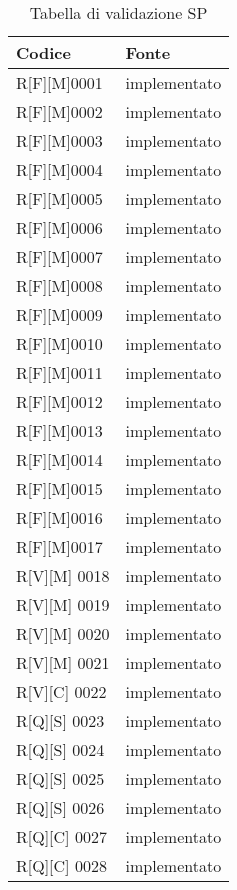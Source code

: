 \begin{center}
    \begin{longtable}{|p{3cm}|p{3cm}|}%
    \caption{Tabella di validazione SP}
    \label{tab:validazione-sp}
    \endfirsthead
    \endhead
    \hline
    \textbf{Codice}  & \textbf{Fonte}\\
    \hline
    R[F][M]0001    & implementato  \\
    \hline
    R[F][M]0002    & implementato  \\
    \hline
    R[F][M]0003    & implementato  \\
    \hline
    R[F][M]0004    & implementato  \\
    \hline
    R[F][M]0005    & implementato  \\
    \hline
    R[F][M]0006    & implementato  \\
    \hline
    R[F][M]0007    & implementato  \\
    \hline
    R[F][M]0008    & implementato  \\
    \hline
    R[F][M]0009    & implementato  \\
    \hline
    R[F][M]0010    & implementato  \\
    \hline
    R[F][M]0011    & implementato  \\
    \hline
    R[F][M]0012    & implementato  \\
    \hline
    R[F][M]0013    & implementato  \\
    \hline
    R[F][M]0014    & implementato  \\
    \hline
    R[F][M]0015    & implementato  \\
    \hline
    R[F][M]0016    & implementato  \\
    \hline
    R[F][M]0017    & implementato  \\
    \hline
    R[V][M] 0018    & implementato  \\
    \hline
    R[V][M] 0019    & implementato  \\
    \hline
    R[V][M] 0020    & implementato  \\
    \hline
    R[V][M] 0021    & implementato  \\
    \hline
    R[V][C] 0022    & implementato  \\
    \hline
    R[Q][S] 0023    & implementato  \\
    \hline
    R[Q][S] 0024    & implementato  \\
    \hline
    R[Q][S] 0025    & implementato  \\
    \hline
    R[Q][S] 0026    & implementato  \\
    \hline
    R[Q][C] 0027    & implementato  \\
    \hline
    R[Q][C] 0028    & implementato  \\
    \hline
    \end{longtable}
    \end{center}%